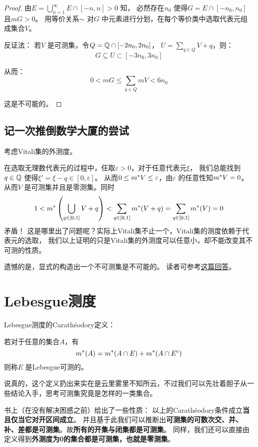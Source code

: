 \begin{proof}
    由\(E= \bigcup_{n=1}^{\infty} E\cap [-n,n]>0\) 知，
    必然存在\(n_{0}\) 使得\(G=E\cap [-n_{0},n_{0}]\) 且\(mG>0\)。
    用等价关系\(\sim\) 对\(G\) 中元素进行分划，在每个等价类中选取代表元组成集合\(V\)。

    反证法： 若\(V\) 是可测集，令\(Q=\mathbb{Q}\cap[-2n_{0},2n_{0}]\)，
    \(U=\sum_{q\in Q} V+q\)，则：
    \[
        G \subseteq U \subset [-3n_{0},3n_{0}]
    \]

    从而： \[
        0<m G\leq \sum_{q\in Q} mV<6n_{0}
    \]

    这是不可能的。
\end{proof}

\subsection{记一次推倒数学大厦的尝试}
考虑Vitali集的外测度。

在选取无理数代表元的过程中，任取\(\varepsilon>0\)，对于任意代表元\(\xi\)，
我们总能找到\(q \in \mathbb{Q}\) 使得\(\xi'=\xi-q \in [0,\varepsilon]\)。
从而\(0\leq m^{*} V\leq \varepsilon\)，由\(\varepsilon\)
的任意性知\(m^{*} V=0\)。从而\(V\) 是可测集并且是零测集。同时\[
    1<m^{*}\left( \bigcup_{q\in [0,1]} V+q  \right) < \sum_{q
    \in [0,1]} m^{*}(V+q) = \sum_{q\in [0,1]} m^{*}(V) = 0
\]
矛盾！
这是哪里出了问题呢？实际上Vitali集不止一个，Vitali集的测度依赖于代表元的选取，
我们以上证明的只是Vitali集的外测度可以任意小，却不能改变其不可测的性质。

遗憾的是，显式的构造出一个不可测集是不可能的。
读者可参考\href{https://math.stackexchange.com/questions/226559/examples-of-non-measurable-sets-in-mathbbr}{这篇回答}。

\section{Lebesgue测度}
Lebesgue测度的Carathéodory定义：
\begin{definition}{}{}
    若对于任意的集合\(A\)，有
    \[
        m^{*}(A)=m^{*}(A\cap E)+m^{*}(A\cap E^{c})
    \]
    则称\(E\) 是Lebesgue可测的。
\end{definition}

说真的，这个定义扔出来实在是云里雾里不知所云，不过我们可以先壮着胆子从一些结论入手，思考可测集究竟是怎样的一类集合。

书上（在没有解决困惑之前）给出了一些性质： 以上的Carathéodory条件成立\textbf{当且仅当它对开区间成立}。
并且基于此我们可以推断出\textbf{可测集的可数次交、并、补、差都是可测集}。故\textbf{所有的开集与闭集都是可测集}。
同样，我们还可以直接由定义得到\textbf{外测度为0的集合都是可测集，也就是零测集}。

